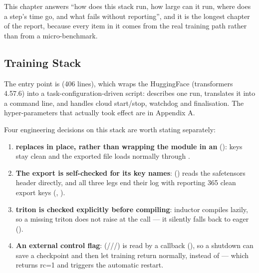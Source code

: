 This chapter answers ``how does this stack run, how large can it run, where does a step's time go,
and what fails without reporting'', and it is the longest chapter of the report, because every
item in it comes from the real training path rather than from a micro-benchmark.

\subsection{Training Stack}

The entry point is  (406 lines), which wraps the HuggingFace
 (transformers 4.57.6) into a task-configuration-driven script: 
describes one run,  translates it into a command line, and
 handles cloud start/stop, watchdog and finalisation. The
hyper-parameters that actually took effect are in Appendix A.

Four engineering decisions on this stack are worth stating separately:

\begin{enumerate}
  \item \textbf{ replaces  in place, rather than wrapping the
        module in an } (): 
        keys stay clean and the exported file loads normally through .
  \item \textbf{The export is self-checked for its key names}: 
        () reads the safetensors header directly, and all three legs end
        their log with \code{[verify]} reporting 365 clean export keys (,
        ).
  \item \textbf{triton is checked explicitly before compiling}: inductor compiles lazily, so a
        missing triton does not raise at the  call --- it silently falls
        back to eager ().
  \item \textbf{An external control flag}: 
        (///) is read by a callback
        (), so a shutdown can save a checkpoint and then let training
        return normally, instead of  --- which returns rc=1 and triggers the
        automatic restart.
\end{enumerate}

